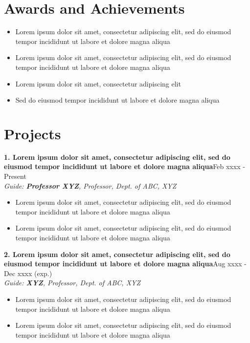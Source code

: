 \documentclass[11pt]{article}
\begin{document}
\section{Awards and Achievements}
	\begin{itemize}
		\setlength\itemsep{0.01cm}
		\item{Lorem ipsum dolor sit amet, consectetur adipiscing elit, sed do eiusmod tempor incididunt ut labore et dolore magna aliqua}
		\item{Lorem ipsum dolor sit amet, consectetur adipiscing elit, sed do eiusmod tempor incididunt ut labore et dolore magna aliqua}
		\item{Lorem ipsum dolor sit amet, consectetur adipiscing elit}
		\item{Sed do eiusmod tempor incididunt ut labore et dolore magna aliqua}
	\end{itemize}
\section{Projects}
	{\bf 1. Lorem ipsum dolor sit amet, consectetur adipiscing elit, sed do eiusmod tempor incididunt ut labore et dolore magna aliqua}\hfill Feb xxxx - Present \\
	{\it Guide: {\bf Professor XYZ}, Professor, Dept. of ABC, XYZ}
	\begin{itemize}
	\setlength\itemsep{0.4px}
	\item{Lorem ipsum dolor sit amet, consectetur adipiscing elit, sed do eiusmod tempor incididunt ut labore et dolore magna aliqua}
	\item{Lorem ipsum dolor sit amet, consectetur adipiscing elit, sed do eiusmod tempor incididunt ut labore et dolore magna aliqua}
	\end{itemize}
	{\bf 2. Lorem ipsum dolor sit amet, consectetur adipiscing elit, sed do eiusmod tempor incididunt ut labore et dolore magna aliqua}\hfill Aug xxxx - Dec xxxx (exp.) \\
	{\it Guide: {\bf XYZ}, Professor, Dept. of ABC, XYZ}
	\begin{itemize}
	\setlength\itemsep{0.4px}
	\item{Lorem ipsum dolor sit amet, consectetur adipiscing elit, sed do eiusmod tempor incididunt ut labore et dolore magna aliqua}
	\item{Lorem ipsum dolor sit amet, consectetur adipiscing elit, sed do eiusmod tempor incididunt ut labore et dolore magna aliqua}
	\end{itemize}
\end{document}
